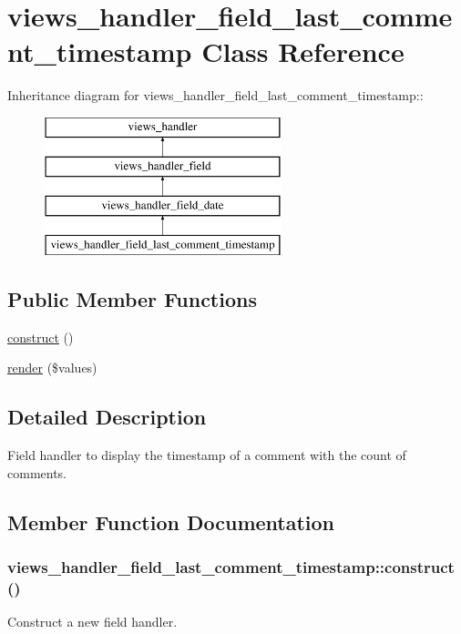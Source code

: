 \hypertarget{classviews__handler__field__last__comment__timestamp}{
\section{views\_\-handler\_\-field\_\-last\_\-comment\_\-timestamp Class Reference}
\label{classviews__handler__field__last__comment__timestamp}
}
Inheritance diagram for views\_\-handler\_\-field\_\-last\_\-comment\_\-timestamp::\begin{figure}[H]
\begin{center}
\leavevmode
\includegraphics[height=4cm]{classviews__handler__field__last__comment__timestamp}
\end{center}
\end{figure}
\subsection*{Public Member Functions}
\begin{DoxyCompactItemize}
\item 
\hyperlink{classviews__handler__field__last__comment__timestamp_aa42644549a55057d5f8c466690ec2692}{construct} ()
\item 
\hyperlink{classviews__handler__field__last__comment__timestamp_ac11bf8393ddb71cd12771cb8b516876a}{render} (\$values)
\end{DoxyCompactItemize}


\subsection{Detailed Description}
Field handler to display the timestamp of a comment with the count of comments. 

\subsection{Member Function Documentation}
\hypertarget{classviews__handler__field__last__comment__timestamp_aa42644549a55057d5f8c466690ec2692}{
\subsubsection[{construct}]{\setlength{\rightskip}{0pt plus 5cm}views\_\-handler\_\-field\_\-last\_\-comment\_\-timestamp::construct ()}}
\label{classviews__handler__field__last__comment__timestamp_aa42644549a55057d5f8c466690ec2692}
Construct a new field handler. 

